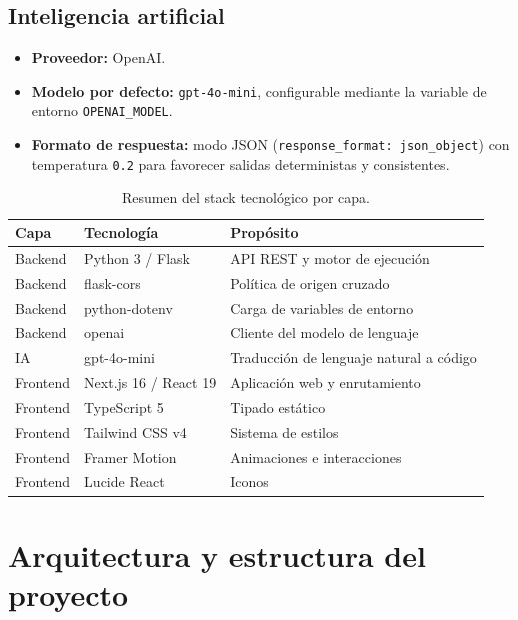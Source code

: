 \documentclass[12pt,a4paper]{article}
\begin{document}
\subsection{Inteligencia artificial}

\begin{itemize}
    \item \textbf{Proveedor:} OpenAI.
    \item \textbf{Modelo por defecto:} \texttt{gpt-4o-mini}, configurable
    mediante la variable de entorno \texttt{OPENAI\_MODEL}.
    \item \textbf{Formato de respuesta:} modo JSON
    (\texttt{response\_format: json\_object}) con temperatura \texttt{0.2} para
    favorecer salidas deterministas y consistentes.
\end{itemize}

\begin{table}[H]
\centering
\caption{Resumen del stack tecnológico por capa.}
\begin{tabularx}{\textwidth}{@{}l l X@{}}
\toprule
\textbf{Capa} & \textbf{Tecnología} & \textbf{Propósito} \\
\midrule
Backend   & Python 3 / Flask        & API REST y motor de ejecución \\
Backend   & flask-cors              & Política de origen cruzado \\
Backend   & python-dotenv           & Carga de variables de entorno \\
Backend   & openai                  & Cliente del modelo de lenguaje \\
IA        & gpt-4o-mini             & Traducción de lenguaje natural a código \\
Frontend  & Next.js 16 / React 19   & Aplicación web y enrutamiento \\
Frontend  & TypeScript 5            & Tipado estático \\
Frontend  & Tailwind CSS v4         & Sistema de estilos \\
Frontend  & Framer Motion           & Animaciones e interacciones \\
Frontend  & Lucide React            & Iconos \\
\bottomrule
\end{tabularx}
\end{table}

\section{Arquitectura y estructura del proyecto}
\end{document}
